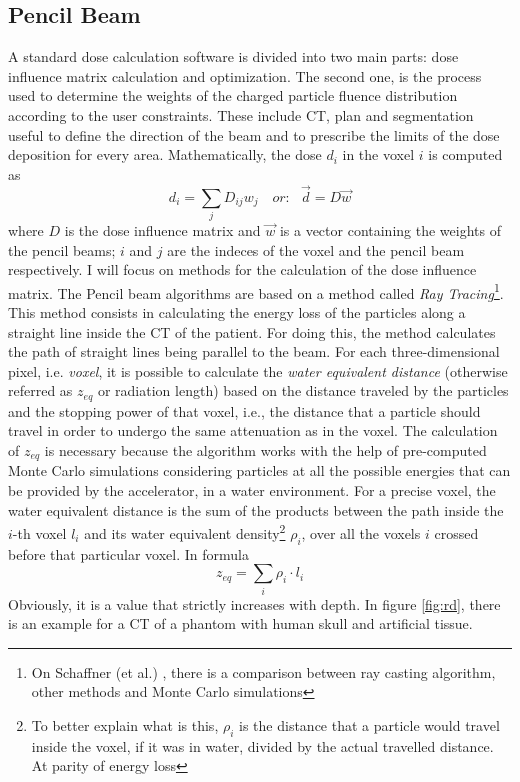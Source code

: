 \documentclass[12pt, a4paper, twoside]{book}
\begin{document}
\subsection{Pencil Beam} 
\label{sec:pen}
A standard dose calculation software is divided into two main parts: dose influence matrix calculation and optimization. The second one, is the process used to determine the weights of the charged particle fluence distribution according to the user constraints. These include CT, plan and segmentation useful to define the direction of the beam and to prescribe the limits of the dose deposition for every area.
Mathematically, the dose $d_i$ in the voxel $i$ is computed as
\[
d_i = \sum_j D_{ij}w_j\,\,\,\,\,\,\textit{or:}\,\,\,\,\,\vec{d} = D\vec{w}
\]
where $D$ is the dose influence matrix and $\vec{w}$ is a vector containing the weights of the pencil beams; $i$ and $j$ are the indeces of the voxel and the pencil beam respectively.
I will focus on methods for the calculation of the dose influence matrix.
The Pencil beam algorithms are based on a method called \emph{Ray Tracing}\footnote{On Schaffner (et al.) \cite{schaf:pba}, there is a comparison between ray casting algorithm, other methods and Monte Carlo simulations}. This method consists in calculating the energy loss of the particles along a straight line inside the CT of the patient. For doing this, the method calculates the path of straight lines being parallel to the beam. For each three-dimensional pixel, i.e. \emph{voxel}, it is possible to calculate the \emph{water equivalent distance} (otherwise referred as $z_{eq}$ or radiation length) based on the distance traveled by the particles and the stopping power of that voxel, i.e., the distance that a particle should travel in order to undergo the same attenuation as in the voxel. The calculation of $z_{eq}$ is necessary because the algorithm works with the help of pre-computed Monte Carlo simulations considering particles at all the possible energies that can be provided by the accelerator, in a water environment. 
For a precise voxel, the water equivalent distance is the sum of the products between the path inside the $i$-th voxel $l_i$ and its water equivalent density\footnote{To better explain what is this, $\rho_i$ is the distance that a particle would travel inside the voxel, if it was in water, divided by the actual travelled distance. At parity of energy loss} $\rho_i$, over all the voxels $i$ crossed before that particular voxel.
In formula
\[
z_{eq} = \sum_{i} \rho_i\cdot l_i
\]
Obviously, it is a value that strictly increases with depth.
In figure \ref{fig:rd}, there is an example for a CT of a phantom with human skull and artificial tissue.
\end{document}
